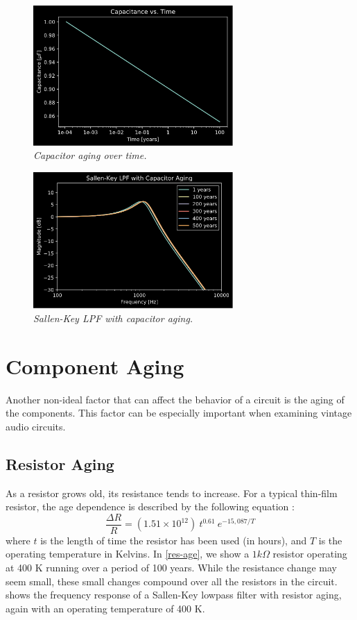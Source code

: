 \documentclass[twoside,a4paper]{article}
\begin{document}
%
\begin{figure}[!htb]
    \center
    \includegraphics[width=3in]{../CMAging/Pics/cap_time.png}
    \caption{\label{cap-age}{\it Capacitor aging over time.}}
\end{figure}
%
\begin{figure}[!htb]
    \center
    \includegraphics[width=3in]{../CMAging/Pics/cap_freq.png}
    \caption{\label{cap-age-freq}{\it Sallen-Key LPF with capacitor aging.}}
\end{figure}
%
\section{Component Aging} \label{sec:age}
%
Another non-ideal factor that can affect the behavior of a circuit is
the aging of the components. This factor can be especially important
when examining vintage audio circuits.
%
\subsection{Resistor Aging} \label{sec:res-age}
%
As a resistor grows old, its resistance tends to increase. For a typical
thin-film resistor, the age dependence is described by the following
equation \cite{thermal_resistors}:
%
\begin{equation}
    \frac{\Delta R}{R} = (1.51 \times 10^{12})\ 
    t^{0.61}\  e^{- 15,087 / T}    
    \label{eq:resistor-age}
\end{equation}
%
where $t$ is the length of time the resistor has been used (in hours), and
$T$ is the operating temperature in Kelvins. In \cref{res-age}, we show
a $1 k\Omega$ resistor operating at 400 K running over a period of 100
years. While the resistance change may seem small, these small changes
compound over all the resistors in the circuit. \Cref{res-age-freq} shows
the frequency response of a Sallen-Key lowpass filter with resistor aging,
again with an operating temperature of 400 K.
%
\end{document}
